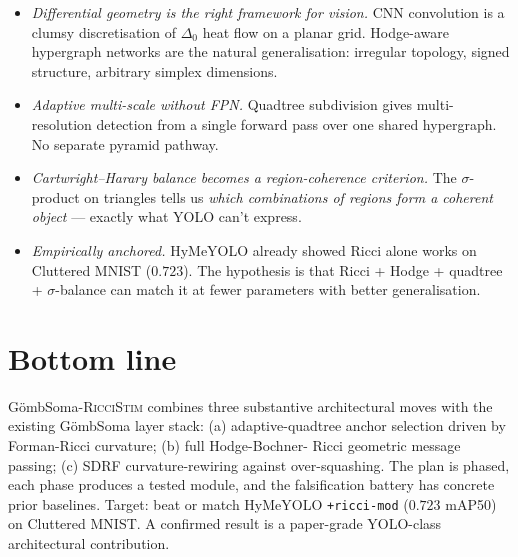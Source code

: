 \documentclass[11pt,a4paper]{article}
\newcommand{\sig}{\ensuremath{\sigma}}
\newcommand{\Soma}{G\"ombSoma}
\newcommand{\RicciStim}{\Soma\textsc{-RicciStim}}
\begin{document}
\begin{itemize}
\item \emph{Differential geometry is the right framework for vision.}
  CNN convolution is a clumsy discretisation of $\Delta_0$ heat flow
  on a planar grid. Hodge-aware hypergraph networks are the natural
  generalisation: irregular topology, signed structure, arbitrary
  simplex dimensions.

\item \emph{Adaptive multi-scale without FPN.} Quadtree subdivision
  gives multi-resolution detection from a single forward pass over
  one shared hypergraph. No separate pyramid pathway.

\item \emph{Cartwright--Harary balance becomes a region-coherence
  criterion.} The $\sig$-product on triangles tells us
  \emph{which combinations of regions form a coherent object} ---
  exactly what YOLO can't express.

\item \emph{Empirically anchored.} HyMeYOLO already showed Ricci alone
  works on Cluttered MNIST ($0.723$). The hypothesis is that Ricci
  + Hodge + quadtree + $\sig$-balance can match it at fewer parameters
  with better generalisation.
\end{itemize}

\section{Bottom line}

\RicciStim{} combines three substantive architectural moves with
the existing \Soma{} layer stack: (a) adaptive-quadtree anchor
selection driven by Forman-Ricci curvature; (b) full Hodge-Bochner-
Ricci geometric message passing; (c) SDRF curvature-rewiring against
over-squashing. The plan is phased, each phase produces a tested
module, and the falsification battery has concrete prior baselines.
Target: beat or match HyMeYOLO \texttt{+ricci-mod} ($0.723$ mAP50)
on Cluttered MNIST. A confirmed result is a paper-grade YOLO-class
architectural contribution.
\end{document}
